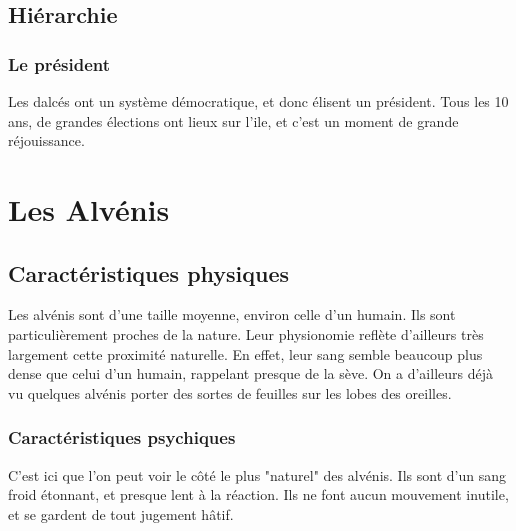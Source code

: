 \subsection{Hiérarchie}
\subsubsection{Le président}
Les dalcés ont un système démocratique, et donc élisent un président. Tous les 10 ans, de grandes élections ont lieux sur l'ile, et c'est un moment de grande réjouissance.

\section{Les Alvénis}
\subsection{Caractéristiques physiques}
Les alvénis sont d'une taille moyenne, environ celle d'un humain. Ils sont particulièrement proches de la nature.
\newline
Leur physionomie reflète d’ailleurs très largement cette proximité naturelle. En effet, leur sang semble beaucoup plus dense que celui d'un humain, rappelant presque de la sève. On a d'ailleurs déjà vu quelques alvénis porter des sortes de feuilles sur les lobes des oreilles.
\subsubsection{Caractéristiques psychiques}
C'est ici que l'on peut voir le côté le plus "naturel" des alvénis. Ils sont d'un sang froid étonnant, et presque lent à la réaction. Ils ne font aucun mouvement inutile, et se gardent de tout jugement hâtif.
